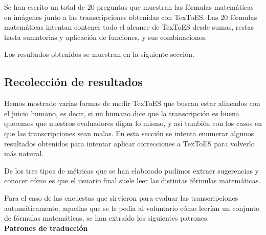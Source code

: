 Se han escrito un total de 20 preguntas que muestran las fórmulas matemáticas en imágenes junto a las transcripciones obtenidas con TexToES. Las 20 fórmulas matemáticas intentan contener todo el alcance de TexToES desde sumas, restas hasta sumatorias y aplicación de funciones, y sus combinaciones.

Los resultados obtenidos se muestran en la siguiente sección.


\subsection{Recolección de resultados}

Hemos mostrado varias formas de medir TexToES que buscan estar alineados con el juicio humano, es decir, si un humano dice que la transcripción es buena queremos que nuestros evaluadores digan lo mismo, y así también con los casos en que las transcripciones sean malas. En esta sección se intenta enumerar algunos resultados obtenidos para intentar aplicar correcciones a TexToES para volverlo más natural.

De los tres tipos de métricas que se han elaborado pudimos extraer sugerencias y conocer cómo es que el usuario final suele leer las distintas fórmulas matemáticas.

Para el caso de las encuestas que sirvieron para evaluar las transcripciones automáticamente, aquellas que se le pedía al voluntario cómo leerían un conjunto de fórmulas matemáticas, se han extraído los siguientes patrones.\\

{\Large \textbf{Patrones de traducción}}\\

